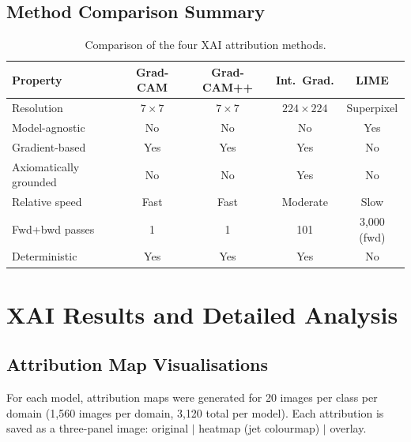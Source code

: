 \documentclass[12pt, a4paper]{article}
\begin{document}
\subsection{Method Comparison Summary}

\begin{table}[H]
\centering
\caption{Comparison of the four XAI attribution methods.}
\label{tab:method_comparison}
\begin{tabular}{lcccc}
\toprule
\textbf{Property} & \textbf{Grad-CAM} & \textbf{Grad-CAM++}
& \textbf{Int.\ Grad.} & \textbf{LIME} \\
\midrule
Resolution       & $7\times7$ & $7\times7$ & $224\times224$ & Superpixel \\
Model-agnostic   & No        & No         & No             & Yes \\
Gradient-based   & Yes       & Yes        & Yes            & No \\
Axiomatically grounded & No  & No         & Yes            & No \\
Relative speed   & Fast      & Fast       & Moderate       & Slow \\
Fwd+bwd passes   & 1         & 1          & 101            & 3{,}000 (fwd) \\
Deterministic    & Yes       & Yes        & Yes            & No \\
\bottomrule
\end{tabular}
\end{table}


\section{XAI Results and Detailed Analysis}
\label{sec:xai_results}

\subsection{Attribution Map Visualisations}

For each model, attribution maps were generated for 20 images per class per
domain (1{,}560 images per domain, 3{,}120 total per model).  Each attribution
is saved as a three-panel image: original $|$ heatmap (jet colourmap) $|$
overlay.
\end{document}
